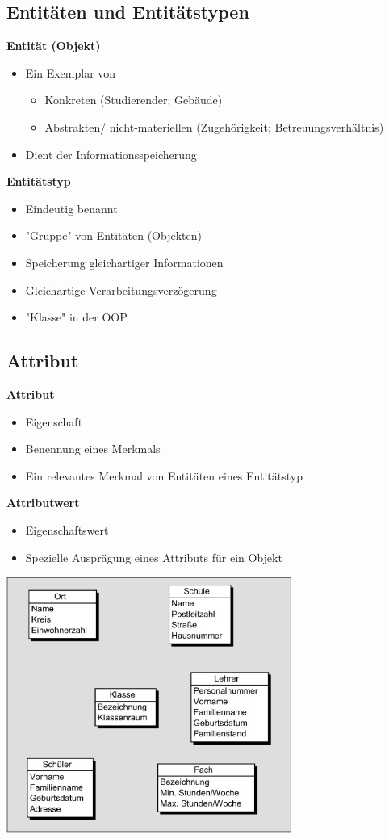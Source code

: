 \documentclass{scrreprt}
\begin{document}
\subsection{Entitäten und Entitätstypen}
\textbf{Entität (Objekt)}
\begin{itemize}
  \item Ein Exemplar von
  \begin{itemize}
    \item Konkreten (Studierender; Gebäude)
    \item Abstrakten/ nicht-materiellen (Zugehörigkeit; Betreuungsverhältnis)
  \end{itemize}
  \item Dient der Informationsspeicherung
\end{itemize}
\textbf{Entitätstyp}
\begin{itemize}
  \item Eindeutig benannt
  \item "Gruppe" von Entitäten (Objekten)
  \item Speicherung gleichartiger Informationen
  \item Gleichartige Verarbeitungsverzögerung
  \item "Klasse" in der OOP
\end{itemize}
\subsection{Attribut}
\textbf{Attribut}
\begin{itemize}
  \item Eigenschaft
  \item Benennung eines Merkmals
  \item Ein relevantes Merkmal von Entitäten eines Entitätstyp
\end{itemize}
\textbf{Attributwert}
\begin{itemize}
  \item Eigenschaftswert
  \item Spezielle Ausprägung eines Attributs für ein Objekt
\end{itemize}
\includegraphics[width=0.7\textwidth]{"graphics/BSP-entity"}
\end{document}

